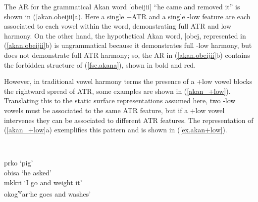 \documentclass[,doc,floatsintext]{apa6}
\theoremstyle{definition}
\theoremstyle{definition}
\theoremstyle{definition}
\theoremstyle{remark}
\begin{document}
The AR for the grammatical Akan word {[}obeijii{]} \enquote{he came and
removed it} is shown in (\ref{akan.obeijii}a). Here a single +ATR and a
single -low feature are each associated to each vowel within the word,
demonstrating full ATR and low harmony. On the other hand, the
hypothetical Akan word, {[}obej\textipa{II}{]}, represented in
(\ref{akan.obeijii}b) is ungrammatical because it demonstrates full -low
harmony, but does not demonstrate full ATR harmony; so, the AR in
(\ref{akan.obeijii}b) contains the forbidden structure of
(\ref{fsc.akana}), shown in bold and red.

However, in traditional vowel harmony terms the presence of a +low vowel
blocks the rightward spread of ATR, some examples are shown in
(\ref{akan_+low}). Translating this to the static surface
representations assumed here, two -low vowels must be associated to the
same ATR feature, but if a +low vowel intervenes they can be associated
to different ATR features. The representation of (\ref{akan_+low}a)
exemplifies this pattern and is shown in (\ref{ex.akan+low}).

\begin{exe}
  \label{akan_+low} \\
  \begin{xlist}
    \ex prko  `pig'                                        \\
    \ex obisa `he asked'                                              \\
    \ex mkkri  `I go and weight it'   \\
    \ex okog\textsuperscript{w}ar\textraiseglotstop `he goes and washes' \\
  \end{xlist}
\end{exe}

\begin{exe}
\label{ex.akan+low} \\
\end{exe}
\end{document}
